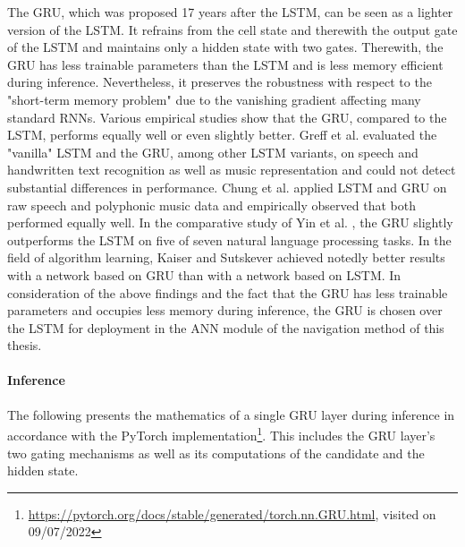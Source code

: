 The GRU,
which was proposed 17 years after the LSTM,
can be seen as a lighter version of the LSTM.
It refrains from the cell state and therewith the output gate
of the LSTM and maintains only a hidden state with two gates.
Therewith, the GRU has less trainable parameters than the LSTM
and is less memory efficient during inference.
Nevertheless, it preserves the robustness with respect to the 
"short-term memory problem" \cite{ICE2020} 
due to the vanishing gradient affecting many standard RNNs.
Various empirical studies show that the GRU, compared to the LSTM,
performs equally well or even slightly better.
Greff et al. \cite{Greff2017} evaluated 
the "vanilla" LSTM and the GRU, among other LSTM variants,
on speech and handwritten text recognition
as well as music representation
and could not detect substantial differences in performance.
Chung et al. \cite{Chung2014} applied LSTM and GRU on
raw speech and polyphonic music data and empirically
observed that both performed equally well.
In the comparative study of 
Yin et al. \cite{Yin2017}, 
the GRU slightly outperforms
the LSTM on five of seven
natural language processing tasks.
In the field of algorithm learning, 
Kaiser and Sutskever \cite{Kaiser2015} achieved notedly better results 
with a network based on GRU
than with a network based on LSTM.
In consideration of the above findings and the
fact that the GRU has less trainable parameters
and occupies less memory during inference,
the GRU is chosen over the LSTM for deployment 
in the ANN module of the navigation method of this thesis.




\paragraph*{Inference}$\ $\\
The following presents the mathematics of a single GRU layer during inference
in accordance with the PyTorch implementation\footnote{
    \url{https://pytorch.org/docs/stable/generated/torch.nn.GRU.html}, visited on 09/07/2022
}.
This includes the GRU layer's two gating mechanisms
as well as its computations of the candidate and the hidden state.






